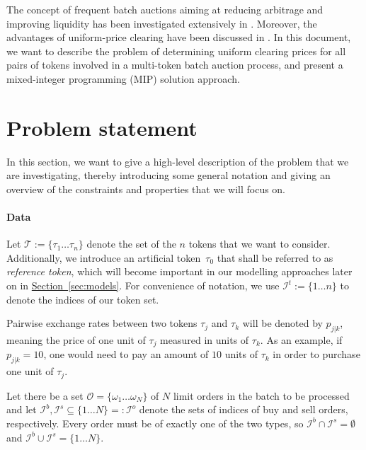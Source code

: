 \documentclass[11pt,parskip=full]{scrartcl}%
\newcommand*{\tokens}{\mathcal{T}}          %
\newcommand*{\orders}{\mathcal{O}}          %
\newcommand*{\iorders}{\mathcal{I}^o}       %
\newcommand*{\ibuyorders}{\mathcal{I}^b}    %
\newcommand*{\isellorders}{\mathcal{I}^s}   %
\newcommand*{\secref}[1]{\hyperref[{#1}]{Section~\ref*{#1}}}
\begin{document}
The concept of frequent batch auctions aiming at reducing arbitrage and improving liquidity has
been investigated extensively in \cite{BUDISH-ET-AL_2015:HFT}.
Moreover, the advantages of uniform-price clearing have been discussed in 
\cite{ENGELBRECHT-KAHN_1998:multi-unit-auctions}.
In this document, we want to describe the problem of determining uniform clearing prices for all
pairs of tokens involved in a multi-token batch auction process, and present a mixed-integer
programming (MIP) solution approach.


\clearpage
\section{Problem statement}
\label{sec:problem}

In this section, we want to give a high-level description of the problem that we are investigating,
thereby introducing some general notation and giving an overview of the constraints and properties
that we will focus on.

\vspace{-.3cm}
\paragraph{Data}

Let $ \tokens := \{ \tau_1 \ldots \tau_n \} $ denote the set of the $ n $ tokens that we want to
consider.
Additionally, we introduce an artificial token~$ \tau_0 $ that shall be referred to as 
\emph{reference token}, which will become important in our modelling approaches later on in 
\secref{sec:models}.
For convenience of notation, we use $ \mathcal{I}^t := \{ 1 \ldots n \} $ to denote the indices
of our token set.

Pairwise exchange rates between two tokens $ \tau_j $ and $ \tau_k $ will be denoted by
$ p_{j|k} $, meaning the price of one unit of $ \tau_j $ measured in units of $ \tau_k $.
As an example, if $ p_{j|k} = 10 $, one would need to pay an amount of $ 10 $ units of $ \tau_k $
in order to purchase one unit of $ \tau_j $.

Let there be a set $ \orders = \{ \omega_1 \ldots \omega_N \} $ of $ N $ limit orders in the batch
to be processed and let $ \ibuyorders, \isellorders \subseteq \{ 1 \ldots N \} =: \iorders $ denote
the sets of indices of buy and sell orders, respectively.
Every order must be of exactly one of the two types, so $ \ibuyorders \cap \isellorders =
\emptyset $ and $ \ibuyorders \cup \isellorders = \{ 1 \ldots N \} $.
\end{document}
